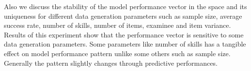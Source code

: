 \begin{otherlanguage}{english}
Also we discuss the stability of the model performance vector in the space and its uniqueness for different data generation parameters such as sample size, average success  rate, number of skills, number of items, examinee and item variance. Results of this experiment show that the performance vector is sensitive to some data generation parameters. Some parameters like number of skills has a tangible effect on model performance pattern unlike some others such as sample size. Generally the pattern slightly changes through predictive performances. 


\end{otherlanguage}
